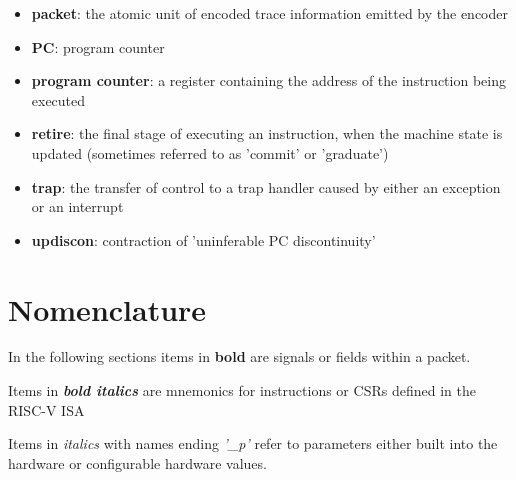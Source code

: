 \begin{itemize}
  \item \textbf{packet}: the atomic unit of encoded trace information emitted by the encoder
  \item \textbf{PC}: program counter
  \item \textbf{program counter}: a register containing the address of the instruction being executed
  \item \textbf{retire}: the final stage of executing an instruction, when the machine state is updated (sometimes referred to as 'commit' or 'graduate')
  \item \textbf{trap}: the transfer of control to a trap handler caused by either an exception or an interrupt
  \item \textbf{updiscon}: contraction of 'uninferable PC discontinuity'
\end{itemize}

\section{Nomenclature}

In the following sections items in \textbf{bold} are signals or
fields within a packet.

Items in \textbf{\textit{bold italics}} are mnemonics for instructions or CSRs defined in the RISC-V ISA

Items in \textit{italics} with names ending \textit{'\_p'} refer to parameters either built into the
hardware or configurable hardware values.


